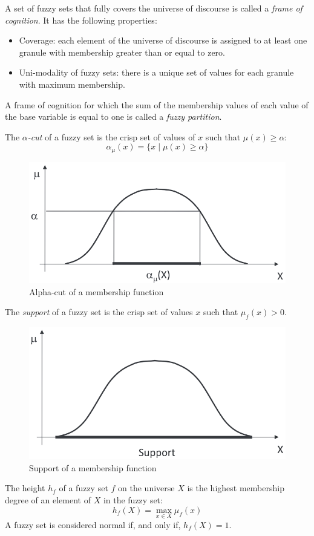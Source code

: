 \documentclass[12pt, a4paper]{report}
\begin{document}
    \begin{definition}
        A set of fuzzy sets that fully covers the universe of discourse is called a \emph{frame of cognition}. It has the following properties:
        \begin{itemize}
            \item Coverage: each element of the universe of discourse is assigned to at least one granule with membership greater than or equal to zero.
            \item Uni-modality of fuzzy sets: there is a unique set of values for each granule with maximum membership. 
        \end{itemize}

        A frame of cognition for which the sum of the membership values of each value of the base variable is equal to one is called a \emph{fuzzy partition}.

        The \emph{$\alpha$-cut} of a fuzzy set is the crisp set of values of $x$ such that $\mu(x) \geq \alpha$:
        \[\alpha_\mu(x)=\{x \mid \mu(x) \geq \alpha\}\]
    \end{definition}
    \begin{figure}[H]
        \centering
        \includegraphics[width=0.4\linewidth]{images/alpha.png}
        \caption{Alpha-cut of a membership function}
    \end{figure}
    \begin{definition}
        The \emph{support} of a fuzzy set is the crisp set of values $x$ such that $\mu_f(x)>0$. 
    \end{definition}
    \begin{figure}[H]
        \centering
        \includegraphics[width=0.4\linewidth]{images/support.png}
        \caption{Support of a membership function}
    \end{figure}
    \begin{definition}
        The height $h_f$ of a fuzzy set $f$ on the universe $X$ is the highest membership degree of an element of $X$ in the fuzzy set:
        \[h_f(X)=\max_{x \in X}\mu_f(x)\]
        A fuzzy set is considered normal if, and only if, $h_f(X)=1$.
    \end{definition}
\end{document}

